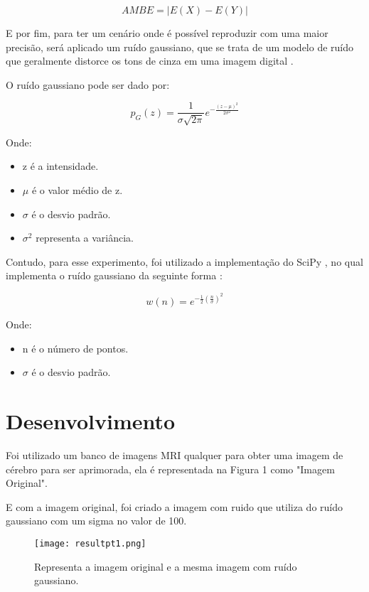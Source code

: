 \documentclass[conference]{IEEEtran}
\begin{document}
\begin{equation}
AMBE = |E(X) - E(Y)|     
\end{equation}

E por fim, para ter um cenário onde é possível reproduzir com uma maior precisão, será aplicado um ruído gaussiano, que se trata de um modelo de ruído que geralmente distorce os tons de cinza em uma imagem digital \cite{b15}.

O ruído gaussiano pode ser dado por:

\begin{equation}
p_{G}(z)={\frac {1}{\sigma {\sqrt {2\pi }}}}e^{-{\frac {(z-\mu )^{2}}{2\sigma ^{2}}}}
\end{equation}

Onde:

\begin{itemize}
\item z é a intensidade.
\item \({\mu}\) é o valor médio de z.
\item \({\sigma}\) é o desvio padrão.
\item \({\sigma^2}\)  representa a variância.
\end{itemize}

Contudo, para esse experimento, foi utilizado a implementação do SciPy \cite{b4}, no qual implementa o ruído gaussiano da seguinte forma \cite{b15}:

\begin{equation}
w(n) = e^{ -\frac{1}{2}\left(\frac{n}{\sigma}\right)^2 }
\end{equation}

Onde:

\begin{itemize}
\item n é o número de pontos.
\item \({\sigma}\) é o desvio padrão.
\end{itemize}

\section{Desenvolvimento}

Foi utilizado um banco de imagens MRI qualquer para obter uma imagem de cérebro para ser aprimorada, ela é representada na Figura 1 como "Imagem Original".

E com a imagem original, foi criado a imagem com ruido que utiliza do ruído gaussiano com um sigma no valor de 100. 

\begin{figure}[H]
    \centering
    \texttt{[image: resultpt1.png]}
    \caption{Representa a imagem original e a mesma imagem com ruído gaussiano.}
    \label{fig:label1}
\end{figure}
\end{document}
